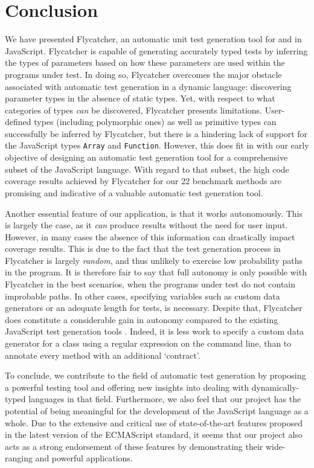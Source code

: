 \chapter{Conclusion}

We have presented \textsf{Flycatcher}, an automatic unit test generation tool for and in JavaScript. \textsf{Flycatcher} is capable of generating accurately typed tests by inferring the types of parameters based on how these parameters are used within the programs under test. In doing so, \textsf{Flycatcher} overcomes the major obstacle associated with automatic test generation in a dynamic language: discovering parameter types in the absence of static types. Yet, with respect to what categories of types \emph{can} be discovered, \textsf{Flycatcher} presents limitations. User-defined types (including polymorphic ones) as well as primitive types can successfully be inferred by \textsf{Flycatcher}, but there is a hindering lack of support for the JavaScript types \texttt{Array} and \texttt{Function}. However, this does fit in with our early objective of designing an automatic test generation tool for a comprehensive subset of the JavaScript language. With regard to that subset, the high code coverage results achieved by \textsf{Flycatcher} for our 22 benchmark methods are promising and indicative of a valuable automatic test generation tool.

Another essential feature of our application, is that it works autonomously. This is largely the case, as it \emph{can} produce results without the need for user input. However, in many cases the absence of this information can drastically impact coverage results. This is due to the fact that the test generation process in \textsf{Flycatcher} is largely \emph{random}, and thus unlikely to exercise low probability paths in the program. It is therefore fair to say that full autonomy is only possible with \textsf{Flycatcher} in the best scenarios, when the programs under test do not contain improbable paths. In other cases, specifying variables such as custom data generators or an adequate length for tests, is necessary. Despite that, \textsf{Flycatcher} does constitute a considerable gain in autonomy compared to the existing JavaScript test generation tools \cite{saxena2010symbolic, alshraideh2008complete, contract-driven, artzi2011framework}. Indeed, it is less work to specify a custom data generator for a class using a regular expression on the command line, than to annotate every method with an additional `contract'.

To conclude, we contribute to the field of automatic test generation by proposing a powerful testing tool and offering new insights into dealing with dynamically-typed languages in that field. Furthermore, we also feel that our project has the potential of being meaningful for the development of the JavaScript language as a whole. Due to the extensive and critical use of state-of-the-art features proposed in the latest version of the ECMAScript standard, it seems that our project also acts as a strong endorsement of these features by demonstrating their wide-ranging and powerful applications.

